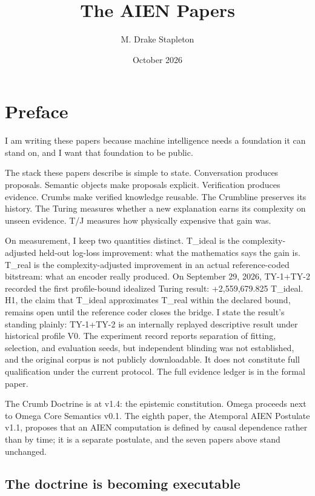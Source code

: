 \documentclass[11pt,letterpaper]{article}
\title{The AIEN Papers}
\author{M. Drake Stapleton}
\date{October 2026}
\begin{document}
\maketitle
\thispagestyle{empty}

\newpage
\section*{Preface}

I am writing these papers because machine intelligence needs a foundation it can stand on, and I want that foundation to be public.

The stack these papers describe is simple to state. Conversation produces proposals. Semantic objects make proposals explicit. Verification produces evidence. Crumbs make verified knowledge reusable. The Crumbline preserves its history. The Turing measures whether a new explanation earns its complexity on unseen evidence. T/J measures how physically expensive that gain was.

On measurement, I keep two quantities distinct. T\_ideal is the complexity-adjusted held-out log-loss improvement: what the mathematics says the gain is. T\_real is the complexity-adjusted improvement in an actual reference-coded bitstream: what an encoder really produced. On September 29, 2026, TY-1+TY-2 recorded the first profile-bound idealized Turing result: +2,559,679.825 T\_ideal. H1, the claim that T\_ideal approximates T\_real within the declared bound, remains open until the reference coder closes the bridge. I state the result's standing plainly: TY-1+TY-2 is an internally replayed descriptive result under historical profile V0. The experiment record reports separation of fitting, selection, and evaluation seeds, but independent blinding was not established, and the original corpus is not publicly downloadable. It does not constitute full qualification under the current protocol. The full evidence ledger is in the formal paper.

The Crumb Doctrine is at v1.4: the epistemic constitution. Omega proceeds next to Omega Core Semantics v0.1. The eighth paper, the Atemporal AIEN Postulate v1.1, proposes that an AIEN computation is defined by causal dependence rather than by time; it is a separate postulate, and the seven papers above stand unchanged.

\subsection*{The doctrine is becoming executable}
\end{document}
